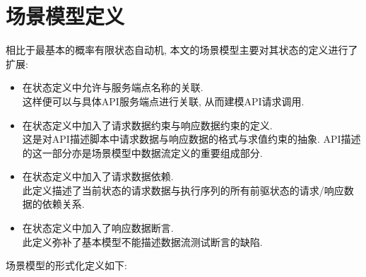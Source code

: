     \section{场景模型定义}
        相比于最基本的概率有限状态自动机, 本文的场景模型主要对其状态的定义进行了扩展:
        \begin{itemize}
            \item 在状态定义中允许与服务端点名称的关联.\\
            这样便可以与具体API服务端点进行关联, 从而建模API请求调用.
        
            \item 在状态定义中加入了请求数据约束与响应数据约束的定义.\\
            这是对API描述脚本中请求数据与响应数据的格式与求值约束的抽象. API描述的这一部分亦是场景模型中数据流定义的重要组成部分.
            
            \item 在状态定义中加入了请求数据依赖.\\
            此定义描述了当前状态的请求数据与执行序列的所有前驱状态的请求/响应数据的依赖关系.
            
            \item 在状态定义中加入了响应数据断言.\\
            此定义弥补了基本模型不能描述数据流测试断言的缺陷.
        \end{itemize}
        
        场景模型的形式化定义如下:
        

